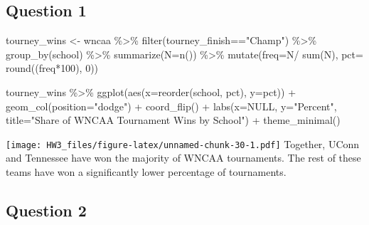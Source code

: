 \documentclass[
]{article}
\newenvironment{Shaded}{\begin{snugshade}}{\end{snugshade}}
\newcommand{\AttributeTok}[1]{\textcolor[rgb]{0.77,0.63,0.00}{#1}}
\newcommand{\ConstantTok}[1]{\textcolor[rgb]{0.00,0.00,0.00}{#1}}
\newcommand{\DecValTok}[1]{\textcolor[rgb]{0.00,0.00,0.81}{#1}}
\newcommand{\FunctionTok}[1]{\textcolor[rgb]{0.00,0.00,0.00}{#1}}
\newcommand{\NormalTok}[1]{#1}
\newcommand{\OtherTok}[1]{\textcolor[rgb]{0.56,0.35,0.01}{#1}}
\newcommand{\SpecialCharTok}[1]{\textcolor[rgb]{0.00,0.00,0.00}{#1}}
\newcommand{\StringTok}[1]{\textcolor[rgb]{0.31,0.60,0.02}{#1}}
\begin{document}
\hypertarget{question-1-2}{%
\subsection{Question 1}\label{question-1-2}}

\begin{Shaded}
\begin{Highlighting}[]
\NormalTok{tourney\_wins }\OtherTok{\textless{}{-}}\NormalTok{ wncaa }\SpecialCharTok{\%\textgreater{}\%} 
  \FunctionTok{filter}\NormalTok{(tourney\_finish}\SpecialCharTok{==}\StringTok{"Champ"}\NormalTok{) }\SpecialCharTok{\%\textgreater{}\%} 
  \FunctionTok{group\_by}\NormalTok{(school) }\SpecialCharTok{\%\textgreater{}\%} 
  \FunctionTok{summarize}\NormalTok{(}\AttributeTok{N=}\FunctionTok{n}\NormalTok{()) }\SpecialCharTok{\%\textgreater{}\%} 
  \FunctionTok{mutate}\NormalTok{(}\AttributeTok{freq=}\NormalTok{N}\SpecialCharTok{/} \FunctionTok{sum}\NormalTok{(N),}
         \AttributeTok{pct=} \FunctionTok{round}\NormalTok{((freq}\SpecialCharTok{*}\DecValTok{100}\NormalTok{), }\DecValTok{0}\NormalTok{)) }
\end{Highlighting}
\end{Shaded}

\begin{Shaded}
\begin{Highlighting}[]
\NormalTok{tourney\_wins }\SpecialCharTok{\%\textgreater{}\%} 
  \FunctionTok{ggplot}\NormalTok{(}\FunctionTok{aes}\NormalTok{(}\AttributeTok{x=}\FunctionTok{reorder}\NormalTok{(school, pct), }\AttributeTok{y=}\NormalTok{pct)) }\SpecialCharTok{+}
  \FunctionTok{geom\_col}\NormalTok{(}\AttributeTok{position=}\StringTok{"dodge"}\NormalTok{) }\SpecialCharTok{+}
  \FunctionTok{coord\_flip}\NormalTok{() }\SpecialCharTok{+} 
  \FunctionTok{labs}\NormalTok{(}\AttributeTok{x=}\ConstantTok{NULL}\NormalTok{, }\AttributeTok{y=}\StringTok{"Percent"}\NormalTok{,}
       \AttributeTok{title=}\StringTok{"Share of WNCAA Tournament Wins by School"}\NormalTok{) }\SpecialCharTok{+}
  \FunctionTok{theme\_minimal}\NormalTok{()}
\end{Highlighting}
\end{Shaded}

\texttt{[image: HW3\_files/figure-latex/unnamed-chunk-30-1.pdf]}
Together, UConn and Tennessee have won the majority of WNCAA
tournaments. The rest of these teams have won a significantly lower
percentage of tournaments.

\hypertarget{question-2-1}{%
\subsection{Question 2}\label{question-2-1}}
\end{document}

